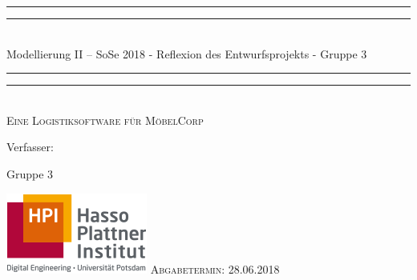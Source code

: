 \documentclass[11pt]{article}
\newlength{\drop}
\begin{document}
  \begin{titlepage}
    \textheight
    \centering
    \vspace*{\baselineskip}
    \rule{\textwidth}{1.6pt}\vspace*{-\baselineskip}\vspace*{2pt}
    \rule{\textwidth}{0.4pt}\\[\baselineskip]
    {\LARGE Modellierung II – SoSe 2018 - Reflexion des Entwurfsprojekts - Gruppe 3}\\[0.2\baselineskip]
    \rule{\textwidth}{0.4pt}\vspace*{-\baselineskip}\vspace{3.2pt}
    \rule{\textwidth}{1.6pt}\\[\baselineskip]
    \scshape
    Eine Logistiksoftware für MöbelCorp\par
    \vspace*{2\baselineskip}
    Verfasser: \\[\baselineskip]
    {\Large Gruppe 3\par}
    \centering
    \vspace{1cm}
    \includegraphics[width=0.25 \textwidth]{hpi.png}
    \vfill
    {\scshape Abgabetermin: 28.06.2018\\}
  \end{titlepage}
\end{document}
